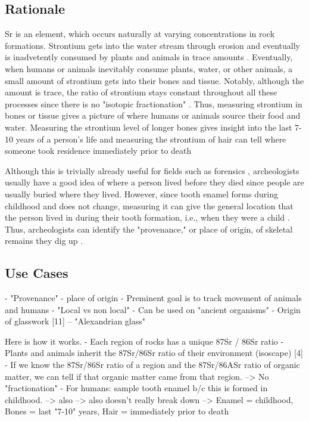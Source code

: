 \documentclass[a4paper, 12pt]{article}
\begin{document}
\subsection{Rationale}
Sr is an element, which occurs naturally at varying concentrations in rock formations.
Strontium gets into the water stream through erosion and eventually is inadvetently consumed by plants and animals in trace amounts \citep{bartelink2019}.
Eventually, when humans or animals inevitably consume plants, water, or other animals,
a small amount of strontium gets into their bones and tissue. Notably, although the amount is trace, the
ratio of strontium stays constant throughout all these processes since there is no "isotopic fractionation" \citep{bartelink2019}.
Thus, measuring strontium in bones or tissue gives a picture of where humans or animals source their food and water.
Measuring the strontium level of longer bones gives insight into the last 7-10
years of a person's life and measuring the strontium of hair can tell where someone
took residence immediately prior to death \citep{kamenov2014}

Although this is trivially already useful for fields such as forensics \citep{kamenov2014},
archeologists usually have a good idea of where a person lived before they died
since people are usually buried where they lived. However, since tooth enamel
forms during childhood and does not change, measuring it can give the general location
that the person lived in during their tooth formation, i.e., when they were a child
\citep*{holt2021,kozieradzkaogunmakin2021,lazzerini2021}. Thus, archeologists can
identify the "provenance," or place of origin, of skeletal remains they dig up \citep{holt2021}.


\subsection{Use Cases}
- "Provenance" - place of origin \citep{holt2021}
- Preminent goal is to track movement of animals and humans
- "Local vs non local" \citep{holt2021}
- Can be used on "ancient organisms" \citep{crowley2017}
- Origin of glasswork [11] -- "Alexandrian glass"

Here is how it works.
- Each region of rocks has a unique 87Sr / 86Sr ratio
- Plants and animals inherit the 87Sr/86Sr ratio of their environment (isoscape) [4]
- If we know the 87Sr/86Sr ratio of a region and the 87Sr/86ASr ratio of organic matter, we can tell if that organic matter came from that region.
--> No "fractionation" \citep{bartelink2019}
- For humans: sample tooth enamel b/c this is formed in childhood. \citep{kozieradzkaogunmakin2021} \citep{holt2021}
--> also \citep{lazzerini2021}
--> also doesn't really break down \citep{kozieradzkaogunmakin2021}
--> Enamel = childhood, Bones = last "7-10" years, Hair = immediately prior to death \citep{kamenov2014}
\end{document}
